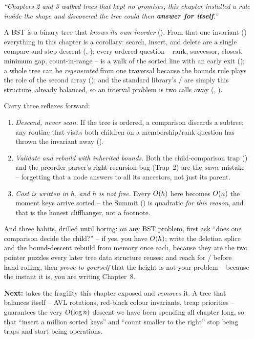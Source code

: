 \begin{lastword}
\emph{``Chapters 2 and 3 walked trees that kept no promises; this chapter installed a rule inside the
shape and discovered the tree could then \textbf{answer for itself}.''}

\medskip
A BST is a binary tree that \emph{knows its own inorder} (). From that one
invariant () everything in this chapter is a corollary: search, insert, and delete
are a single compare-and-step descent (, ); every ordered
question -- rank, successor, closest, minimum gap, count-in-range -- is a walk of the sorted line with
an early exit (); a whole tree can be \emph{regenerated} from one traversal because
the bounds rule plays the role of the second array (); and the standard library's
/ are simply this structure, already balanced, so an interval problem is two
 calls away (, ).

\medskip
Carry three reflexes forward:
\begin{enumerate}[nosep, leftmargin=1.6em]
  \item \emph{Descend, never scan.} If the tree is ordered, a comparison discards a subtree; any routine
        that visits both children on a membership/rank question has thrown the invariant away
        ().
  \item \emph{Validate and rebuild with inherited bounds.} Both the child-comparison trap
        () and the preorder parser's right-recursion bug (Trap~2) are the
        \emph{same} mistake -- forgetting that a node answers to all its ancestors, not just its parent.
  \item \emph{Cost is written in $h$, and $h$ is not free.} Every $O(h)$ here becomes $O(n)$ the
        moment keys arrive sorted -- the Summit () is quadratic \emph{for this
        reason}, and that is the honest cliffhanger, not a footnote.
\end{enumerate}

\medskip
And three habits, drilled until boring: on any BST problem, first ask ``does one comparison decide the
child?'' -- if yes, you have $O(h)$; write the deletion splice and the bound-descent rebuild from
memory once each, because they are the two pointer puzzles every later tree data structure reuses;
and reach for / before hand-rolling, then \emph{prove to yourself} that
the height is not your problem -- because the instant it is, you are writing Chapter~8.

\medskip
\textbf{Next:}  takes the fragility this chapter exposed and \emph{removes} it. A tree that
balances itself -- AVL rotations, red-black colour invariants, treap priorities -- guarantees the very
$O(\log n)$ descent we have been spending all chapter long, so that ``insert a million sorted keys''
and ``count smaller to the right'' stop being traps and start being operations.
\end{lastword}
